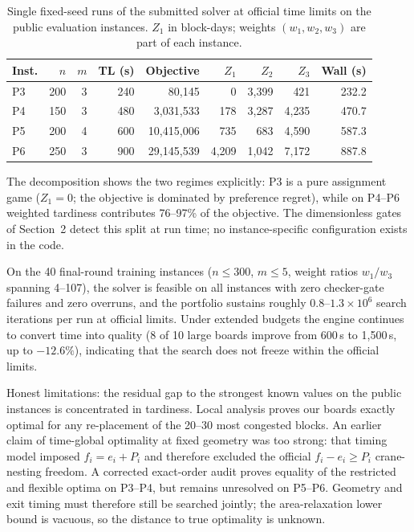 \documentclass[runningheads]{llncs}
\begin{document}
\begin{table}[t]
\centering
\caption{Single fixed-seed runs of the submitted solver at official time
limits on the public evaluation instances. $Z_1$ in block-days; weights
$(w_1, w_2, w_3)$ are part of each instance.}
\label{tab:results}
\begin{tabular}{lrrrrrrrr}
\toprule
Inst. & $n$ & $m$ & TL (s) & Objective & $Z_1$ & $Z_2$ & $Z_3$ & Wall (s) \\
\midrule
P3 & 200 & 3 & 240 & 80{,}145 & 0 & 3{,}399 & 421 & 232.2 \\
P4 & 150 & 3 & 480 & 3{,}031{,}533 & 178 & 3{,}287 & 4{,}235 & 470.7 \\
P5 & 200 & 4 & 600 & 10{,}415{,}006 & 735 & 683 & 4{,}590 & 587.3 \\
P6 & 250 & 3 & 900 & 29{,}145{,}539 & 4{,}209 & 1{,}042 & 7{,}172 & 887.8 \\
\bottomrule
\end{tabular}
\end{table}

The decomposition shows the two regimes explicitly: P3 is a pure
assignment game ($Z_1 = 0$; the objective is dominated by preference regret),
while on P4--P6 weighted tardiness contributes 76--97\% of the objective.
The dimensionless gates of Section~2 detect this split at run time; no
instance-specific configuration exists in the code.

On the 40 final-round training instances ($n \le 300$, $m \le 5$, weight
ratios $w_1/w_3$ spanning 4--107), the solver is feasible on all instances
with zero checker-gate failures and zero overruns, and the portfolio
sustains roughly $0.8$--$1.3 \times 10^6$ search iterations per run at
official limits. Under extended budgets the engine continues to convert time
into quality (8 of 10 large boards improve from 600\,s to 1{,}500\,s, up to
$-12.6\%$), indicating that the search does not freeze within the official
limits.

Honest limitations: the residual gap to the strongest known values on the
public instances is concentrated in tardiness. Local analysis proves our
boards exactly optimal for any re-placement of the 20--30 most congested
blocks. An earlier claim of time-global optimality at fixed geometry was too
strong: that timing model imposed $f_i=e_i+P_i$ and therefore excluded the
official $f_i-e_i\ge P_i$ crane-nesting freedom. A corrected exact-order audit
proves equality of the restricted and flexible optima on P3--P4, but remains
unresolved on P5--P6. Geometry and exit timing must therefore still be searched
jointly; the area-relaxation lower bound is vacuous, so the distance to true
optimality is unknown.
\end{document}
